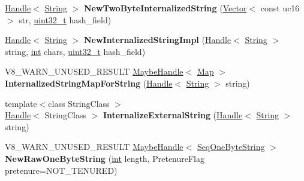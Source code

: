 \begin{DoxyCompactItemize}
\item 
\mbox{\label{classv8_1_1internal_1_1Factory_aaca5f65fac87463451bfac25824b1626}} 
\mbox{\hyperlink{classv8_1_1internal_1_1Handle}{Handle}}$<$ \mbox{\hyperlink{classv8_1_1internal_1_1String}{String}} $>$ {\bfseries New\+Two\+Byte\+Internalized\+String} (\mbox{\hyperlink{classv8_1_1internal_1_1Vector}{Vector}}$<$ const uc16 $>$ str, \mbox{\hyperlink{classuint32__t}{uint32\+\_\+t}} hash\+\_\+field)
\item 
\mbox{\label{classv8_1_1internal_1_1Factory_ab71713e88964354c50218f7fb5f24829}} 
\mbox{\hyperlink{classv8_1_1internal_1_1Handle}{Handle}}$<$ \mbox{\hyperlink{classv8_1_1internal_1_1String}{String}} $>$ {\bfseries New\+Internalized\+String\+Impl} (\mbox{\hyperlink{classv8_1_1internal_1_1Handle}{Handle}}$<$ \mbox{\hyperlink{classv8_1_1internal_1_1String}{String}} $>$ string, \mbox{\hyperlink{classint}{int}} chars, \mbox{\hyperlink{classuint32__t}{uint32\+\_\+t}} hash\+\_\+field)
\item 
\mbox{\label{classv8_1_1internal_1_1Factory_a0974722057fbb90196db776a07052a38}} 
V8\+\_\+\+W\+A\+R\+N\+\_\+\+U\+N\+U\+S\+E\+D\+\_\+\+R\+E\+S\+U\+LT \mbox{\hyperlink{classv8_1_1internal_1_1MaybeHandle}{Maybe\+Handle}}$<$ \mbox{\hyperlink{classv8_1_1internal_1_1Map}{Map}} $>$ {\bfseries Internalized\+String\+Map\+For\+String} (\mbox{\hyperlink{classv8_1_1internal_1_1Handle}{Handle}}$<$ \mbox{\hyperlink{classv8_1_1internal_1_1String}{String}} $>$ string)
\item 
\mbox{\label{classv8_1_1internal_1_1Factory_a6a5311ca09b9c655bc76a9be696861c2}} 
{\footnotesize template$<$class String\+Class $>$ }\\\mbox{\hyperlink{classv8_1_1internal_1_1Handle}{Handle}}$<$ String\+Class $>$ {\bfseries Internalize\+External\+String} (\mbox{\hyperlink{classv8_1_1internal_1_1Handle}{Handle}}$<$ \mbox{\hyperlink{classv8_1_1internal_1_1String}{String}} $>$ string)
\item 
\mbox{\label{classv8_1_1internal_1_1Factory_a07b6db64d4e33dff5a5e6075a53892d5}} 
V8\+\_\+\+W\+A\+R\+N\+\_\+\+U\+N\+U\+S\+E\+D\+\_\+\+R\+E\+S\+U\+LT \mbox{\hyperlink{classv8_1_1internal_1_1MaybeHandle}{Maybe\+Handle}}$<$ \mbox{\hyperlink{classv8_1_1internal_1_1SeqOneByteString}{Seq\+One\+Byte\+String}} $>$ {\bfseries New\+Raw\+One\+Byte\+String} (\mbox{\hyperlink{classint}{int}} length, Pretenure\+Flag pretenure=N\+O\+T\+\_\+\+T\+E\+N\+U\+R\+ED)

\end{DoxyCompactItemize}
